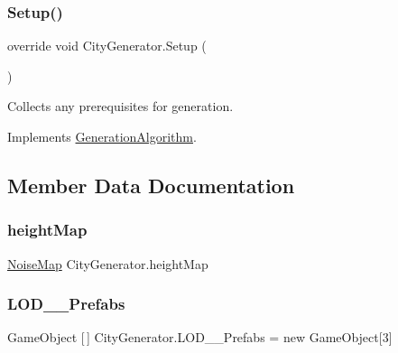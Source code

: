 \subsubsection{\texorpdfstring{Setup()}{Setup()}}
{\footnotesize\ttfamily override void City\+Generator.\+Setup (\begin{DoxyParamCaption}{ }\end{DoxyParamCaption})\hspace{0.3cm}{\ttfamily [virtual]}}



Collects any prerequisites for generation. 



Implements \mbox{\hyperlink{class_generation_algorithm_a5e891b08f0c1d8f4ccc9ad06667691ec}{Generation\+Algorithm}}.



\subsection{Member Data Documentation}
\mbox{\label{class_city_generator_a41f981122cd74ff6758e7b4dda236085}} 
\subsubsection{\texorpdfstring{height\+Map}{heightMap}}
{\footnotesize\ttfamily \mbox{\hyperlink{class_noise_map}{Noise\+Map}} City\+Generator.\+height\+Map}

\mbox{\label{class_city_generator_aa3865cc4ee840dc1d72701093efa4c24}} 
\subsubsection{\texorpdfstring{L\+O\+D\+\_\+\_\+\+Prefabs}{LOD\_0\_Prefabs}}
{\footnotesize\ttfamily Game\+Object \mbox{[}$\,$\mbox{]} City\+Generator.\+L\+O\+D\+\_\+\_\+\+Prefabs = new Game\+Object\mbox{[}3\mbox{]}}

\mbox{\label{class_city_generator_a9c2dcf98212de701d637f3f3d39214c9}} 
